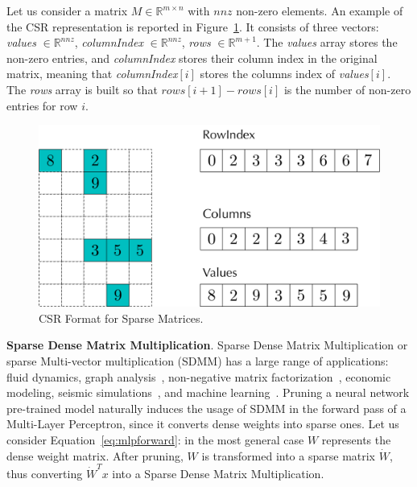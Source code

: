 Let us consider a matrix $M \in \mathbb{R}^{m \times n}$ with $nnz$ non-zero elements. 
An example of the  CSR representation is reported in Figure~\ref{fig:sparsecsr}. It consists of three vectors: \textit{values} $\in \mathbb{R}^{nnz}$, \textit{columnIndex} $ \in \mathbb{R}^{nnz}$, \textit{rows} $\in \mathbb{R}^{m+1}$. 
The \textit{values} array stores the non-zero entries, and \textit{columnIndex} stores their column index in the original matrix, meaning that \textit{columnIndex}$[i]$ stores the columns index of \textit{values}$[i]$. The \textit{rows} array is built so that $rows[i+1] - rows[i] $ is the number of non-zero entries for row $i$. 

\begin{figure}
\centering
	\includegraphics[width=0.8\columnwidth]{imgs/CSR_sparse.pdf}
	\caption{CSR Format for Sparse Matrices.}
	\label{fig:sparsecsr}
\end{figure}


\smallskip
\noindent \textbf{Sparse Dense Matrix Multiplication}.
Sparse Dense Matrix Multiplication or sparse Multi-vector multiplication (SDMM) has a large range of applications: fluid dynamics, graph analysis~\cite{tiskin2001all}, non-negative matrix factorization~\cite{kim2011fast}, economic modeling, seismic simulations~\cite{breuer2019petaflop}, and machine learning~\cite{NIPS2010_4099}. Pruning a neural network pre-trained model naturally induces the usage of SDMM in the forward pass of a Multi-Layer Perceptron, since it converts dense weights into sparse ones. Let us consider Equation~\ref{eq:mlpforward}: in the most general case $W$ represents the dense weight matrix. After pruning, $W$ is transformed into a sparse matrix $\dot{W}$, thus converting $\dot{W}^T x$  into a Sparse Dense Matrix Multiplication.

